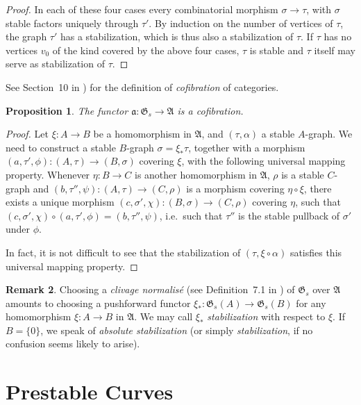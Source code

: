 \documentclass[11pt]{amsart}
\newtheorem{prop}{Proposition}[section]
\theoremstyle{definition}
\newtheorem{numrmk}[prop]{Remark}
\theoremstyle{remark}
\newenvironment{pf}{\begin{proof}}{\end{proof}}
\newcommand{\lst}{_{\ast}}
\renewcommand{\AA}{{\mathfrak{A}}}
\newcommand{\GG}{{\mathfrak{G}}}
\newcommand{\Aa}{{\mathfrak{a}}}
\newcommand{\comp}{\mathbin{{\scriptstyle\circ}}}
\theoremstyle{plain}
\theoremstyle{definition}
\theoremstyle{remark}
\begin{document}
\begin{pf}
In each of these four cases every combinatorial morphism
\(\sigma\rightarrow\tau\), with \(\sigma\) stable factors uniquely
through \(\tau'\). By induction on the number of vertices of \(\tau\), the graph
\(\tau'\) has a stabilization, which is thus
also a stabilization of \(\tau\). If \(\tau\) has no vertices \(v_0\) of the kind
covered by the above four cases, \(\tau\) is stable
and \(\tau\) itself may serve as stabilization of \(\tau\).
\end{pf}

See Section~10 in \cite[Exp.\ ~VI]{sga1}) for the definition of {\em
cofibration } of categories.

\begin{prop} \label{goscf}
The functor \(\Aa:\GG_s\rightarrow\AA\) is a cofibration.
\end{prop}
\begin{pf}
Let \(\xi:A\rightarrow B\) be a homomorphism in \(\AA\), and \((\tau,\alpha)\) a
stable \(A\)-graph. We need to construct a
stable \(B\)-graph \(\sigma=\xi\lst\tau\), together with a morphism
\((a,\tau',\phi):(A,\tau)\rightarrow(B,\sigma)\) covering
\(\xi\), with the following universal mapping property. Whenever
\(\eta:B\rightarrow C\) is another homomorphism in \(\AA\),
\(\rho\) is a stable \(C\)-graph and \((b,\tau'',\psi):(A,\tau)\rightarrow(C,\rho)\)
is a morphism covering \(\eta\comp\xi\),
there exists a unique morphism \((c,\sigma',\chi):(B,\sigma)\rightarrow(C,\rho)\)
covering \(\eta\), such that
\((c,\sigma',\chi)\comp(a,\tau',\phi)=(b,\tau'',\psi)\), i.e.\ such that \(\tau''\)
is the stable pullback of \(\sigma'\)
under \(\phi\).

In fact, it is not difficult to see that the stabilization of
\((\tau,\xi\comp\alpha)\) satisfies this universal mapping
property.
\end{pf}

\begin{numrmk} \label{pfabs}
Choosing a {\em clivage normalis\'e }(see Definition~7.1 in \cite[Exp.\
{}~VI]{sga1}) of
\(\GG_s\) over \(\AA\) amounts to choosing a pushforward functor
\(\xi\lst:\GG_s(A)\rightarrow\GG_s(B)\) for any homomorphism
\(\xi:A\rightarrow B\) in \(\AA\). We may call \(\xi\lst\) {\em stabilization } with
respect to \(\xi\). If \(B=\{0\}\), we speak
of {\em absolute stabilization }(or simply {\em stabilization}, if no confusion
seems likely to arise).
\end{numrmk}


\section{Prestable Curves}
\end{document}
